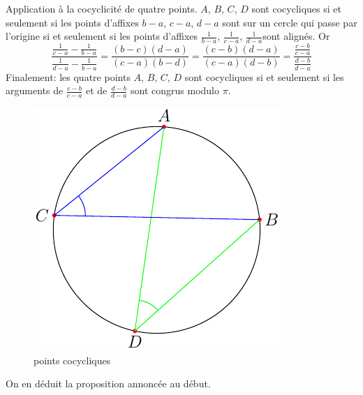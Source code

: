 Application à la cocyclicité de quatre points.\newline
$A$, $B$, $C$, $D$ sont cocycliques si et seulement si les points d'affixes $b-a$, $c-a$, $d-a$ sont sur un cercle qui passe par l'origine si et seulement si les points d'affixes $\frac{1}{b-a}$, $\frac{1}{c-a}$, $\frac{1}{d-a}$sont alignés. \newline
Or
\begin{displaymath}
 \frac{\frac{1}{c-a} - \frac{1}{b-a}}{\frac{1}{d-a}-\frac{1}{b-a}}
=\frac{(b-c)(d-a)}{(c-a)(b-d)}=\frac{(c-b)(d-a)}{(c-a)(d-b)}
=\frac{\frac{c-b}{c-a}}{\frac{d-b}{d-a}}
\end{displaymath}
Finalement: les quatre points $A$, $B$, $C$, $D$ sont cocycliques si et seulement si les arguments de $\frac{c-b}{c-a}$ et de $\frac{d-b}{d-a}$ sont congrus modulo $\pi$.

\begin{figure}[h]
  \centering
  \includegraphics{./C2002_2.pdf}
  \caption{points cocycliques}
  \label{fig:C2002_2}
\end{figure}

On en déduit la proposition annoncée au début.



